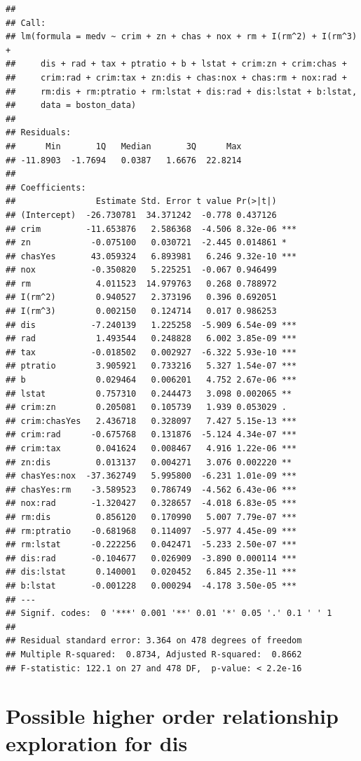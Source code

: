\documentclass[
]{article}
\begin{document}
\begin{verbatim}
## 
## Call:
## lm(formula = medv ~ crim + zn + chas + nox + rm + I(rm^2) + I(rm^3) + 
##     dis + rad + tax + ptratio + b + lstat + crim:zn + crim:chas + 
##     crim:rad + crim:tax + zn:dis + chas:nox + chas:rm + nox:rad + 
##     rm:dis + rm:ptratio + rm:lstat + dis:rad + dis:lstat + b:lstat, 
##     data = boston_data)
## 
## Residuals:
##      Min       1Q   Median       3Q      Max 
## -11.8903  -1.7694   0.0387   1.6676  22.8214 
## 
## Coefficients:
##                Estimate Std. Error t value Pr(>|t|)    
## (Intercept)  -26.730781  34.371242  -0.778 0.437126    
## crim         -11.653876   2.586368  -4.506 8.32e-06 ***
## zn            -0.075100   0.030721  -2.445 0.014861 *  
## chasYes       43.059324   6.893981   6.246 9.32e-10 ***
## nox           -0.350820   5.225251  -0.067 0.946499    
## rm             4.011523  14.979763   0.268 0.788972    
## I(rm^2)        0.940527   2.373196   0.396 0.692051    
## I(rm^3)        0.002150   0.124714   0.017 0.986253    
## dis           -7.240139   1.225258  -5.909 6.54e-09 ***
## rad            1.493544   0.248828   6.002 3.85e-09 ***
## tax           -0.018502   0.002927  -6.322 5.93e-10 ***
## ptratio        3.905921   0.733216   5.327 1.54e-07 ***
## b              0.029464   0.006201   4.752 2.67e-06 ***
## lstat          0.757310   0.244473   3.098 0.002065 ** 
## crim:zn        0.205081   0.105739   1.939 0.053029 .  
## crim:chasYes   2.436718   0.328097   7.427 5.15e-13 ***
## crim:rad      -0.675768   0.131876  -5.124 4.34e-07 ***
## crim:tax       0.041624   0.008467   4.916 1.22e-06 ***
## zn:dis         0.013137   0.004271   3.076 0.002220 ** 
## chasYes:nox  -37.362749   5.995800  -6.231 1.01e-09 ***
## chasYes:rm    -3.589523   0.786749  -4.562 6.43e-06 ***
## nox:rad       -1.320427   0.328657  -4.018 6.83e-05 ***
## rm:dis         0.856120   0.170990   5.007 7.79e-07 ***
## rm:ptratio    -0.681968   0.114097  -5.977 4.45e-09 ***
## rm:lstat      -0.222256   0.042471  -5.233 2.50e-07 ***
## dis:rad       -0.104677   0.026909  -3.890 0.000114 ***
## dis:lstat      0.140001   0.020452   6.845 2.35e-11 ***
## b:lstat       -0.001228   0.000294  -4.178 3.50e-05 ***
## ---
## Signif. codes:  0 '***' 0.001 '**' 0.01 '*' 0.05 '.' 0.1 ' ' 1
## 
## Residual standard error: 3.364 on 478 degrees of freedom
## Multiple R-squared:  0.8734, Adjusted R-squared:  0.8662 
## F-statistic: 122.1 on 27 and 478 DF,  p-value: < 2.2e-16
\end{verbatim}

\section{Possible higher order relationship exploration for
dis}\label{possible-higher-order-relationship-exploration-for-dis}
\end{document}
